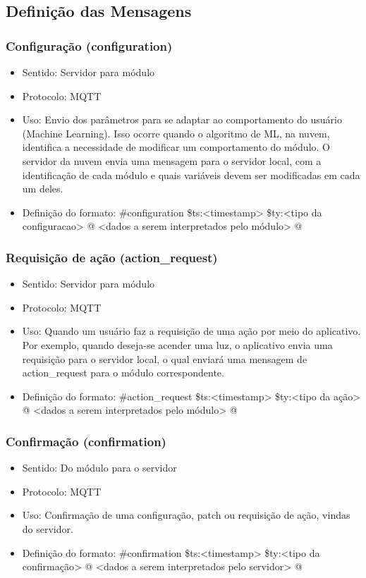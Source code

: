 \subsection{Definição das Mensagens}
\subsubsection{Configuração (configuration)}
\begin{itemize}
\item Sentido: Servidor para módulo
\item Protocolo: MQTT
\item Uso: Envio dos parâmetros para se adaptar ao comportamento do usuário (Machine Learning). Isso ocorre quando o algoritmo de ML, na nuvem, identifica a necessidade de modificar um comportamento do módulo. O servidor da nuvem envia uma mensagem para o servidor local, com a identificação de cada módulo e quais variáveis devem ser modificadas em cada um deles.
\item Definição do formato:
\#configuration
\$ts:\textless timestamp\textgreater
\$ty:\textless tipo da configuracao\textgreater
@
\textless dados a serem interpretados pelo módulo\textgreater
@
\end{itemize}

\subsubsection{Requisição de ação (action\_request)}
\begin{itemize}
\item Sentido: Servidor para módulo
\item Protocolo: MQTT
\item Uso: Quando um usuário faz a requisição de uma ação por meio do aplicativo. Por exemplo, quando deseja-se acender uma luz, o aplicativo envia uma requisição para o servidor local, o qual enviará uma mensagem de action\_request para o módulo correspondente.
\item Definição do formato:
\#action\_request
\$ts:\textless timestamp\textgreater
\$ty:\textless tipo da ação\textgreater
@
\textless dados a serem interpretados pelo módulo\textgreater
@
\end{itemize}

\subsubsection{Confirmação (confirmation)}
\begin{itemize}
\item Sentido: Do módulo para o servidor
\item Protocolo: MQTT
\item Uso: Confirmação de uma configuração, patch ou requisição de ação, vindas do servidor.
\item Definição do formato:
\#confirmation
\$ts:\textless timestamp\textgreater
\$ty:\textless tipo da confirmação\textgreater
@
\textless dados a serem interpretados pelo servidor\textgreater
@
\end{itemize}


